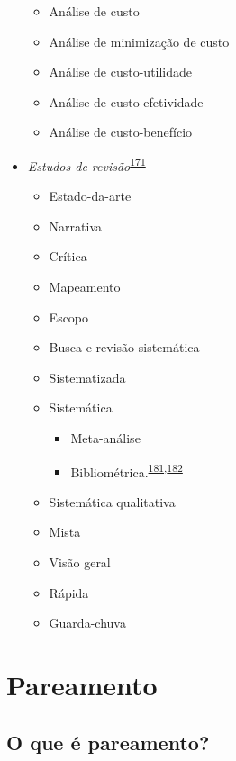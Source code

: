 \documentclass[
  a4paper,
]{book}
\begin{document}
\begin{itemize}
  \begin{itemize}
  \item
    Análise de custo
  \item
    Análise de minimização de custo
  \item
    Análise de custo-utilidade
  \item
    Análise de custo-efetividade
  \item
    Análise de custo-benefício
  \end{itemize}
\item
  \emph{Estudos de revisão}\textsuperscript{\protect\hyperlink{ref-Grant2009}{171}}

  \begin{itemize}
  \item
    Estado-da-arte
  \item
    Narrativa
  \item
    Crítica
  \item
    Mapeamento
  \item
    Escopo
  \item
    Busca e revisão sistemática
  \item
    Sistematizada
  \item
    Sistemática

    \begin{itemize}
    \item
      Meta-análise
    \item
      Bibliométrica.\textsuperscript{\protect\hyperlink{ref-donthu2021}{181},\protect\hyperlink{ref-lim2023}{182}}
    \end{itemize}
  \item
    Sistemática qualitativa
  \item
    Mista
  \item
    Visão geral
  \item
    Rápida
  \item
    Guarda-chuva
  \end{itemize}
\end{itemize}

\hypertarget{pareamento}{%
\section{Pareamento}\label{pareamento}}

\hypertarget{o-que-uxe9-pareamento}{%
\subsection{O que é pareamento?}\label{o-que-uxe9-pareamento}}
\end{document}
